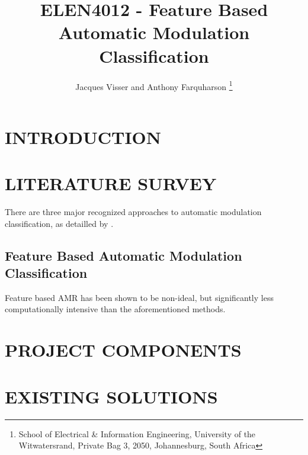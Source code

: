 \documentclass[10pt,twocolumn]{witseiepaper}
\begin{document}
\title{ELEN4012 - Feature Based Automatic Modulation Classification}

\author{Jacques Visser and Anthony Farquharson
\thanks{School of Electrical \& Information Engineering, University of the
Witwatersrand, Private Bag 3, 2050, Johannesburg, South Africa}
}



\maketitle
\thispagestyle{empty}\pagestyle{empty}

\section{INTRODUCTION}

\section{LITERATURE SURVEY}
There are three major recognized approaches to automatic modulation classification, as detailled by \cite{zhu2014automatic}.

\subsection{Feature Based Automatic Modulation Classification}
Feature based AMR has been shown to be non-ideal, but significantly less computationally intensive\cite{zhu2014automatic} than the aforementioned methods.

\section{PROJECT COMPONENTS}

\section{EXISTING SOLUTIONS}
\end{document}
